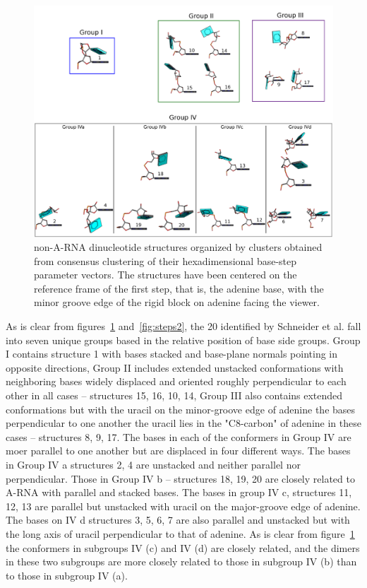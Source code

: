 \begin{figure}[htbp]
 \centering
\includegraphics[angle=90, scale=0.46]{Chapter2/collageb.png}
 \caption{non-A-RNA  dinucleotide  structures  organized  by  clusters
   obtained  from   consensus  clustering  of   their  hexadimensional
   base-step parameter vectors.  The  structures have been centered on
   the reference frame  of the first step, that  is, the adenine base,
   with the minor groove edge of the rigid block on adenine facing the
   viewer.}
 \label{fig:nonAclus}
\end{figure}

As is clear  from figures~\ref{fig:nonAclus} and~\ref{fig:steps2}, the
20 identified by Schneider et  al. fall into seven unique groups based
in  the  relative position  of  base  side  groups. Group  I  contains
structure {1}  with bases stacked  and base-plane normals  pointing in
opposite   directions,   Group    II   includes   extended   unstacked
conformations  with neighboring  bases widely  displaced  and oriented
roughly perpendicular  to each other  in all cases --  structures {15,
  16, 10, 14}, Group III also contains extended conformations but with
the uracil on the minor-groove edge of adenine the bases perpendicular
to one another the uracil lies  in the "C8-carbon" of adenine in these
cases -- structures {8, 9, 17}. The bases in each of the conformers in
Group IV  are moer parallel to  one another but are  displaced in four
different  ways.   The bases  in  Group IV  a  structures  {2, 4}  are
unstacked and neither parallel nor  perpendicular. Those in Group IV b
-- structures {18, 19, 20} are  closely related to A-RNA with parallel
and stacked  bases. The bases in  group IV c, structures  {11, 12, 13}
are parallel  but unstacked  with uracil on  the major-groove  edge of
adenine. The bases  on IV d structures {3, 5, 6,  7} are also parallel
and unstacked but  with the long axis of  uracil perpendicular to that
of adenine.  As is clear from figure~\ref{fig:nonAclus} the conformers
in subgroups IV (c) and IV  (d) are closely related, and the dimers in
these two subgroups  are more closely related to  those in subgroup IV
(b) than to those in subgroup IV (a).

